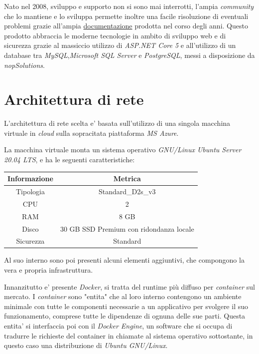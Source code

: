 \documentclass[a4paper]{report}
\begin{document}
			Nato nel 2008, sviluppo e supporto non si sono mai interrotti, l'ampia \emph{community} che lo mantiene
			e lo sviluppa permette inoltre una facile risoluzione di eventuali problemi grazie all'ampia
			\href{https://docs.nopcommerce.com/en/developer/index.html?utm\_source=github&utm\_medium=referral&utm\_campaign=documentation&utm\_content=text}{documentazione}
			prodotta nel corso degli anni. Questo prodotto abbraccia le moderne tecnologie in ambito di sviluppo web e
			di sicurezza grazie al massiccio utilizzo di \emph{ASP.NET Core 5} e all'utilizzo di un database tra \emph{MySQL},\emph{Microsoft SQL Server} e 				\emph{PostgreSQL}, messi a disposizione da \emph{nopSolutions}. 
	\section{Architettura di rete} \label{architettura_di_rete}
		L'architettura di rete scelta e' basata sull'utilizzo di una singola macchina virtuale in \emph{cloud} sulla
		sopracitata piattaforma \emph{MS Azure}.

		La macchina virtuale monta un sistema operativo \emph{GNU/Linux Ubuntu Server 20.04 LTS}, e ha le seguenti
		caratteristiche:
		\begin{center}
			\begin{tabular}{c|c}
				Informazione & Metrica \\
				\hline
				Tipologia & Standard\_D2s\_v3 \\
				CPU & 2 \\
				RAM & 8 GB \\
				Disco & 30 GB SSD Premium con ridondanza locale \\
				Sicurezza & Standard \\
			\end{tabular}
		\end{center}

		Al suo interno sono poi presenti alcuni elementi aggiuntivi, che compongono la vera e propria infrastruttura.

		Innanzitutto e' presente \emph{Docker}, si tratta del runtime più diffuso per \emph{container}
		sul mercato. I \emph{container} sono "entita" che al loro interno contengono un ambiente minimale con tutte le
		componenti necessarie a un applicativo per svolgere il suo funzionamento, comprese tutte le dipendenze di ognuna
		delle sue parti. Questa entita' si interfaccia poi con il \emph{Docker Engine}, un software che si occupa di
		tradurre le richieste del container in chiamate al sistema operativo sottostante, in questo caso una
		distribuzione di \emph{Ubuntu GNU/Linux}.
\end{document}
